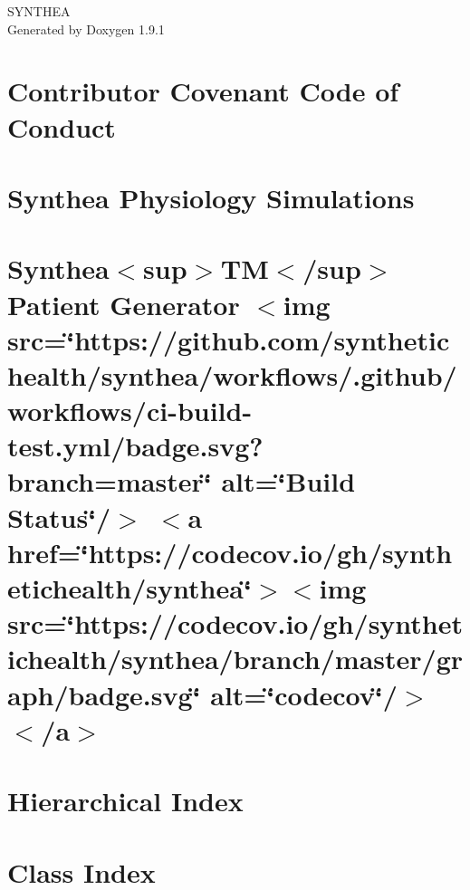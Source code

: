 \let\mypdfximage\pdfximage\def\pdfximage{\immediate\mypdfximage}\documentclass[twoside]{book}
\newcommand{\+}{\discretionary{\mbox{\scriptsize$\hookleftarrow$}}{}{}}
\newcommand{\clearemptydoublepage}{%
  \newpage{\pagestyle{empty}\cleardoublepage}%
}
\begin{document}
\raggedbottom

\hypersetup{pageanchor=false,
             bookmarksnumbered=true,
             pdfencoding=unicode
            }
\begin{titlepage}
\vspace*{7cm}
\begin{center}%
{\Large SYNTHEA }\\
\vspace*{1cm}
{\large Generated by Doxygen 1.9.1}\\
\end{center}
\end{titlepage}
\clearemptydoublepage
{}
\tableofcontents
\clearemptydoublepage
{}
\hypersetup{pageanchor=true}

\chapter{Contributor Covenant Code of Conduct}
\label{md_CODE_OF_CONDUCT}

\chapter{Synthea Physiology Simulations}
\label{md_config_simulations_README}

\chapter{Synthea$<$sup$>$TM$<$/sup$>$ Patient Generator $<$img src=\char`\"{}https\+://github.\+com/synthetichealth/synthea/workflows/.\+github/workflows/ci-\/build-\/test.\+yml/badge.\+svg?branch=master\char`\"{} alt=\char`\"{}\+Build Status\char`\"{}/$>$ $<$a href=\char`\"{}https\+://codecov.\+io/gh/synthetichealth/synthea\char`\"{}$>$$<$img src=\char`\"{}https\+://codecov.\+io/gh/synthetichealth/synthea/branch/master/graph/badge.\+svg\char`\"{} alt=\char`\"{}codecov\char`\"{}/$>$$<$/a$>$}
\label{md_README}

\chapter{Hierarchical Index}

\chapter{Class Index}

\end{document}
